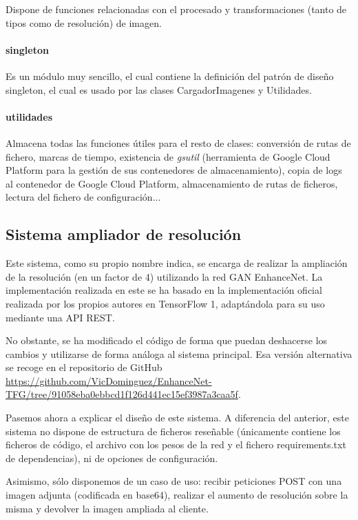 \documentclass[../main.tex]{subfiles}
\begin{document}
    Dispone de funciones relacionadas con el procesado y transformaciones (tanto de tipos como de resolución) de imagen.
    
    \paragraph{singleton}
    Es un módulo muy sencillo, el cual contiene la definición del patrón de diseño singleton, el cual es usado por las clases CargadorImagenes y Utilidades.
    
    \paragraph{utilidades}
    Almacena todas las funciones útiles para el resto de clases: conversión de rutas de fichero, marcas de tiempo, existencia de \textit{gsutil} (herramienta de Google Cloud Platform para la gestión de sus contenedores de almacenamiento), copia de logs al contenedor de Google Cloud Platform, almacenamiento de rutas de ficheros, lectura del fichero de configuración...


\subsection{Sistema ampliador de resolución}
Este sistema, como su propio nombre indica, se encarga de realizar la ampliación de la resolución (en un factor de 4) utilizando la red GAN EnhanceNet. La implementación realizada en este \tfg se ha basado en la implementación oficial realizada por los propios autores en TensorFlow 1, adaptándola para su uso mediante una API REST. \newline

No obstante, se ha modificado el código de forma que puedan deshacerse los cambios y utilizarse de forma análoga al sistema principal. Esa versión alternativa se recoge en el repositorio de GitHub \url{https://github.com/VicDominguez/EnhanceNet-TFG/tree/91058eba0ebbcd1f126d441ec15ef3987a3caa5f}. \newline

Pasemos ahora a explicar el diseño de este sistema. A diferencia del anterior, este sistema no dispone de estructura de ficheros reseñable (únicamente contiene los ficheros de código, el archivo con los pesos de la red y el fichero requirements.txt de dependencias), ni de opciones de configuración. \newline

Asimismo, sólo disponemos de un caso de uso: recibir peticiones POST con una imagen adjunta (codificada en base64), realizar el aumento de resolución sobre la misma y devolver la imagen ampliada al cliente. \newline
\end{document}
